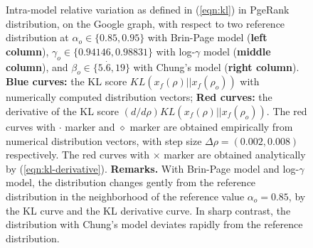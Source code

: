 \documentclass[conference]{IEEEtran}
\begin{document}

\begin{figure}[!htb]
  \centering
  
  \caption{\footnotesize Intra-model relative variation as defined in (\ref{eqn:kl}) in PgeRank
    distribution, on the Google graph, with respect to two reference
    distribution at $\alpha_{o} \in \{0.85,0.95\}$ with Brin-Page model ({\bf left
    column}), $\gamma_{o} \in \{0.94146,0.98831\}$ with log-$\gamma$ model ({\bf middle column}), 
    and $\beta_{o} \in \{5.\dot{6},19\}$ with Chung's model ({\bf right column}). 
    {\bf Blue curves:} the KL score 
    $KL( x_f(\rho) || x_{f}(\rho_{o}) )$ with numerically 
    computed distribution vectors; 
    {\bf Red curves:} the derivative of the KL score 
    $ (d/d\rho) KL( x_f(\rho) || x_{f}(\rho_{o} ))$. 
    The red curves with $\cdot$ marker and $\diamond$ marker are obtained empirically 
    from numerical distribution vectors, with step size 
    $\Delta \rho = (0.002, 0.008) $ respectively. The red curves with $\times$ marker
    are obtained analytically by (\ref{eqn:kl-derivative}). 
    {\bf Remarks.} With Brin-Page model and log-$\gamma$ model, the distribution changes gently from
    the reference distribution in the neighborhood of the reference
    value $\alpha_{o} = 0.85$, by the KL curve and the KL derivative
    curve.  In sharp contrast, the distribution with Chung's model
    deviates rapidly from the reference distribution.  }
  \label{fig:google-param-KL-0.85}
\end{figure}

\end{document}
